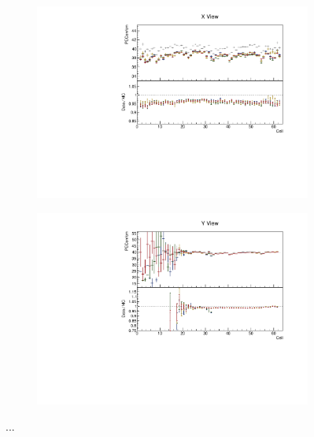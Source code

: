 \documentclass[12pt,a4paper]{article}
\begin{document}
\begin{figure}[!ht]
\begin{subfigure}{0.5\textwidth}
  \end{subfigure}
  \begin{subfigure}{0.5\textwidth}
    \includegraphics[width=\linewidth]{essentialsec_tb/pecorrcm_cell_x.pdf}
  \end{subfigure}
  \begin{subfigure}{0.5\textwidth}
    \includegraphics[width=\linewidth]{essentialsec_tb/pecorrcm_cell_y.pdf}
  \end{subfigure}
  \caption{...}
  \label{figAbsCalibCell1}
\end{figure}
\end{document}
